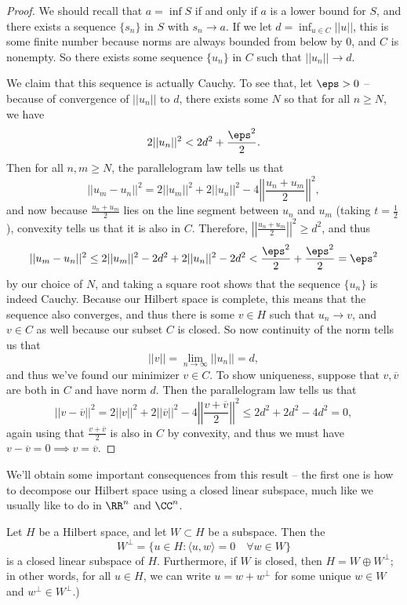 \begin{proof}
We should recall that $a = \inf S$ if and only if $a$ is a lower bound for $S$, and there exists a sequence $\{s_n\}$ in $S$ with $s_n \to a$. If we let $d = \inf_{u \in C} ||u||$, this is some finite number because norms are always bounded from below by $0$, and $C$ is nonempty. So there exists some sequence $\{u_n\}$ in $C$ such that $||u_n|| \to d$. 

We claim that this sequence is actually Cauchy. To see that, let $\eps > 0$ -- because of convergence of $||u_n||$ to $d$, there exists some $N$ so that for all $n \ge N$, we have 
\[
    2||u_n||^2 < 2d^2 + \frac{\eps^2}{2}.
\] 
Then for all $n, m \ge N$, the parallelogram law tells us that
\[
    ||u_m - u_n||^2 = 2||u_m||^2 + 2||u_n||^2 - 4\left|\left|\frac{u_n + u_m}{2}\right|\right|^2,
\]
and now because $\frac{u_n + u_m}{2}$ lies on the line segment between $u_n$ and $u_m$ (taking $t = \frac{1}{2}$), convexity tells us that it is also in $C$. Therefore, $\left|\left|\frac{u_n + u_m}{2}\right|\right|^2 \ge d^2$, and thus
\[
    ||u_m - u_n||^2 \le 2||u_m||^2 - 2d^2 + 2||u_n||^2 - 2d^2 < \frac{\eps^2}{2} + \frac{\eps^2}{2} = \eps^2
\]
by our choice of $N$, and taking a square root shows that the sequence $\{u_n\}$ is indeed Cauchy. Because our Hilbert space is complete, this means that the sequence also converges, and thus there is some $v \in H$ such that $u_n \to v$, and $v \in C$ as well because our subset $C$ is closed. So now continuity of the norm tells us that
\[
    ||v|| = \lim_{n \to \infty} ||u_n|| = d,
\]
and thus we've found our minimizer $v \in C$. To show uniqueness, suppose that $v, \overline{v}$ are both in $C$ and have norm $d$. Then the parallelogram law tells us that
\[
    ||v - \overline{v}||^2 = 2||v||^2 + 2||\overline{v}||^2 - 4\left|\left|\frac{v + \overline{v}}{2}\right|\right|^2 \le 2d^2 + 2d^2 - 4d^2 = 0,
\]
again using that $\frac{v + \overline{v}}{2}$ is also in $C$ by convexity, and thus we must have $v - \overline{v} = 0 \implies v = \overline{v}$.
\end{proof}

We'll obtain some important consequences from this result -- the first one is how to decompose our Hilbert space using a closed linear subspace, much like we usually like to do in $\RR^n$ and $\CC^n$.

\begin{theorem}\label{orthocomplement}
Let $H$ be a Hilbert space, and let $W \subset H$ be a subspace. Then the 
\[
    W^\perp = \{u \in H: \langle u, w \rangle = 0 \quad \forall w \in W\}
\]
is a closed linear subspace of $H$. Furthermore, if $W$ is closed, then $H = W \oplus W^\perp$; in other words, for all $u \in H$, we can write $u = w + w^\perp$ for some unique $w \in W$ and $w^\perp \in W^\perp$.)
\end{theorem}

